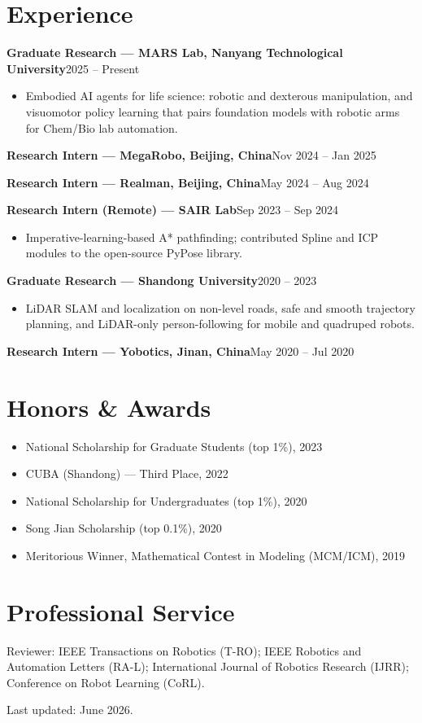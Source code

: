 \documentclass[11pt,a4paper]{article}
\newcommand{\dateit}[2]{\textbf{#1}\hfill #2\par}
\begin{document}
\section{Experience}
\dateit{Graduate Research --- MARS Lab, Nanyang Technological University}{2025 -- Present}
\begin{itemize}
  \item Embodied AI agents for life science: robotic and dexterous manipulation, and visuomotor policy learning that pairs foundation models with robotic arms for Chem/Bio lab automation.
\end{itemize}

\dateit{Research Intern --- MegaRobo, Beijing, China}{Nov 2024 -- Jan 2025}
\dateit{Research Intern --- Realman, Beijing, China}{May 2024 -- Aug 2024}

\dateit{Research Intern (Remote) --- SAIR Lab}{Sep 2023 -- Sep 2024}
\begin{itemize}
  \item Imperative-learning-based A* pathfinding; contributed Spline and ICP modules to the open-source PyPose library.
\end{itemize}

\dateit{Graduate Research --- Shandong University}{2020 -- 2023}
\begin{itemize}
  \item LiDAR SLAM and localization on non-level roads, safe and smooth trajectory planning, and LiDAR-only person-following for mobile and quadruped robots.
\end{itemize}

\dateit{Research Intern --- Yobotics, Jinan, China}{May 2020 -- Jul 2020}

\section{Honors \& Awards}
\begin{itemize}
  \item National Scholarship for Graduate Students (top 1\%), 2023
  \item CUBA (Shandong) --- Third Place, 2022
  \item National Scholarship for Undergraduates (top 1\%), 2020
  \item Song Jian Scholarship (top 0.1\%), 2020
  \item Meritorious Winner, Mathematical Contest in Modeling (MCM/ICM), 2019
\end{itemize}

\section{Professional Service}
Reviewer: IEEE Transactions on Robotics (T-RO); IEEE Robotics and Automation Letters (RA-L); International Journal of Robotics Research (IJRR); Conference on Robot Learning (CoRL).

\vfill
{\footnotesize\color{gray}Last updated: June 2026.}
\end{document}
